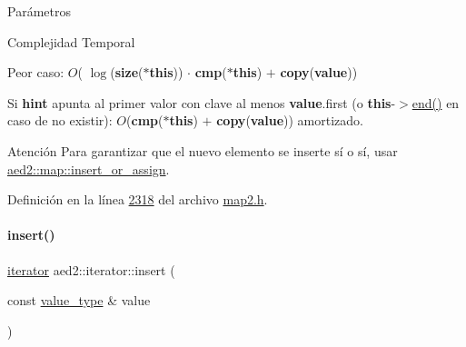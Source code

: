\begin{DoxyParams}{\-Parámetros}
\begin{DoxyCompactItemize}
\begin{DoxyDescription}
\item[Complejidad Temporal]
\begin{DoxyItemize}
\item Peor caso\+: $O$( $\log$({\bfseries size}({\bfseries $\ast$this})) $\cdot$ {\bfseries cmp}({\bfseries $\ast$this}) $+$ {\bfseries copy}({\bfseries value}))
\item Si {\bfseries hint} apunta al primer valor con clave al menos {\bfseries value}.first (o {\bfseries this}-\/$>$\hyperlink{classaed2_1_1iterator_a67caf9468be999e9be96b7add5d79946_a67caf9468be999e9be96b7add5d79946}{end()} en caso de no existir)\+: $O$({\bfseries cmp}({\bfseries $\ast$this}) $+$ {\bfseries copy}({\bfseries value})) amortizado. 
\end{DoxyItemize}
\end{DoxyDescription}

\begin{DoxyAttention}{Atención}
Para garantizar que el nuevo elemento se inserte sí o sí, usar \hyperlink{classaed2_1_1map_a2ef6723c183916276b0afc4a4c721475_a2ef6723c183916276b0afc4a4c721475}{aed2\+::map\+::insert\+\_\+or\+\_\+assign}. 
\end{DoxyAttention}


Definición en la línea \hyperlink{map2_8h_source_l02318}{2318} del archivo \hyperlink{map2_8h_source}{map2.\+h}.

\mbox{\label{classaed2_1_1iterator_aa1870e8bfa4f45c82fa1ee076846922b_aa1870e8bfa4f45c82fa1ee076846922b}} 
\paragraph{\texorpdfstring{insert()}{insert()}\hspace{0.1cm}{\footnotesize\ttfamily [2/2]}}
{\footnotesize\ttfamily \hyperlink{classaed2_1_1iterator_1_1iterator}{iterator} aed2\+::iterator\+::insert (\begin{DoxyParamCaption}\item[{const \hyperlink{classaed2_1_1iterator_a6411a2c08b2b7c52f063bef1a168acb6_a6411a2c08b2b7c52f063bef1a168acb6}{value\+\_\+type} \&}]{value }\end{DoxyParamCaption})\hspace{0.3cm}{\ttfamily [inline]}}


\end{DoxyCompactItemize}
\end{DoxyParams}
